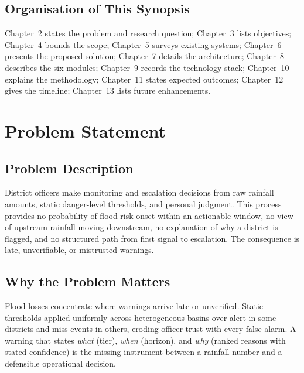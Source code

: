 \documentclass[a4paper,12pt]{report}
\begin{document}
\section{Organisation of This Synopsis}
Chapter~2 states the problem and research question; Chapter~3 lists objectives; Chapter~4 bounds the scope; Chapter~5 surveys existing systems; Chapter~6 presents the proposed solution; Chapter~7 details the architecture; Chapter~8 describes the six modules; Chapter~9 records the technology stack; Chapter~10 explains the methodology; Chapter~11 states expected outcomes; Chapter~12 gives the timeline; Chapter~13 lists future enhancements.

\chapter{Problem Statement}
\section{Problem Description}
District officers make monitoring and escalation decisions from raw rainfall amounts, static danger-level thresholds, and personal judgment. This process provides no probability of flood-risk onset within an actionable window, no view of upstream rainfall moving downstream, no explanation of why a district is flagged, and no structured path from first signal to escalation. The consequence is late, unverifiable, or mistrusted warnings.

\section{Why the Problem Matters}
Flood losses concentrate where warnings arrive late or unverified. Static thresholds applied uniformly across heterogeneous basins over-alert in some districts and miss events in others, eroding officer trust with every false alarm. A warning that states \textit{what} (tier), \textit{when} (horizon), and \textit{why} (ranked reasons with stated confidence) is the missing instrument between a rainfall number and a defensible operational decision.
\end{document}
